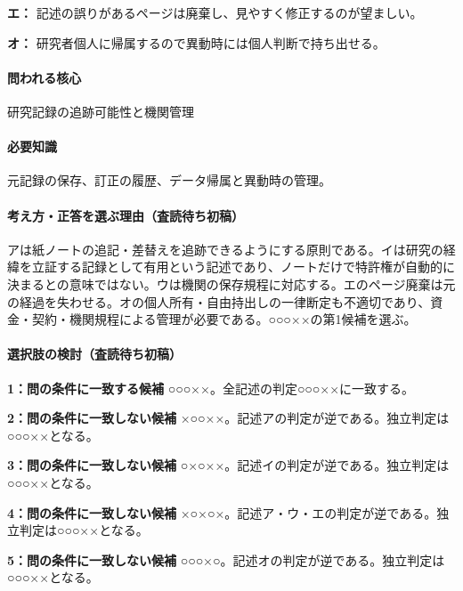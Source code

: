 \noindent\textbf{エ：} 記述の誤りがあるページは廃棄し、見やすく修正するのが望ましい。\par

\noindent\textbf{オ：} 研究者個人に帰属するので異動時には個人判断で持ち出せる。\par

\paragraph{問われる核心} 研究記録の追跡可能性と機関管理

\paragraph{必要知識} 元記録の保存、訂正の履歴、データ帰属と異動時の管理。

\paragraph{考え方・正答を選ぶ理由（査読待ち初稿）} アは紙ノートの追記・差替えを追跡できるようにする原則である。イは研究の経緯を立証する記録として有用という記述であり、ノートだけで特許権が自動的に決まるとの意味ではない。ウは機関の保存規程に対応する。エのページ廃棄は元の経過を失わせる。オの個人所有・自由持出しの一律断定も不適切であり、資金・契約・機関規程による管理が必要である。○○○××の第1候補を選ぶ。

\paragraph{選択肢の検討（査読待ち初稿）}\mbox{}\par

\noindent\textbf{1：問の条件に一致する候補} ○○○××。全記述の判定○○○××に一致する。\par

\noindent\textbf{2：問の条件に一致しない候補} ×○○××。記述アの判定が逆である。独立判定は○○○××となる。\par

\noindent\textbf{3：問の条件に一致しない候補} ○×○××。記述イの判定が逆である。独立判定は○○○××となる。\par

\noindent\textbf{4：問の条件に一致しない候補} ×○×○×。記述ア・ウ・エの判定が逆である。独立判定は○○○××となる。\par

\noindent\textbf{5：問の条件に一致しない候補} ○○○×○。記述オの判定が逆である。独立判定は○○○××となる。\par

